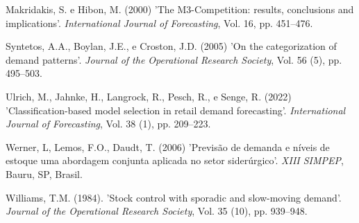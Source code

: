 \documentclass[11pt,a4paper]{article}
\begin{document}
\begin{thebibliography}{12}
Makridakis, S. e Hibon, M. (2000) 'The M3-Competition: results, conclusions and implications'. {\it International Journal of Forecasting}, Vol. 16, pp. 451--476.

Syntetos, A.A., Boylan, J.E., e Croston, J.D. (2005) 'On the categorization of demand patterns'. {\it Journal of the Operational Research Society}, Vol. 56 (5), pp. 495--503.

Ulrich, M., Jahnke, H., Langrock, R., Pesch, R., e Senge, R. (2022) 'Classification-based model selection in retail demand forecasting'. {\it International Journal of Forecasting}, Vol. 38 (1), pp. 209--223.

Werner, L, Lemos, F.O., Daudt, T. (2006) 'Previsão de demanda e níveis de estoque uma abordagem conjunta aplicada no setor siderúrgico'. {\it XIII SIMPEP}, Bauru, SP, Brasil.

Williams, T.M. (1984). 'Stock control with sporadic and slow-moving demand'. {\it Journal of the Operational Research Society}, Vol. 35 (10), pp. 939–948. 

\end{thebibliography} 
\end{document}
